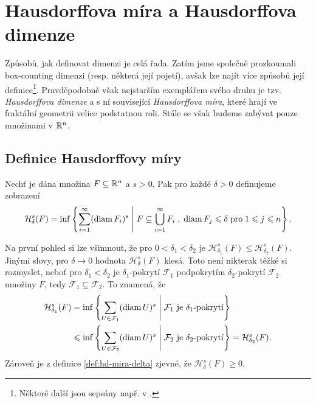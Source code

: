 \section{Hausdorffova míra a Hausdorffova dimenze}\label{sec:hausdorffova-mira-dimenze}

Způsobů, jak definovat dimenzi je celá řada. Zatím jsme společně prozkoumali box-counting dimenzi (resp. některá její pojetí), avšak lze najít více způsobů její definice\footnote{Některé další jsou sepsány např. v \citep[str. 40]{Falconer2014}.}. Pravděpodobně však nejstarším exemplářem svého druhu je tzv. \emph{Hausdorffova dimenze} a s ní související \emph{Hausdorffova míra}, které hrají ve fraktální geometrii velice podstatnou roli. Stále se však budeme zabývat pouze množinami v $\mathbb{R}^n$.

\subsection{Definice Hausdorffovy míry}\label{subsec:hd-mira-definice}

\begin{definition}\label{def:hd-mira-delta}
    Nechť je dána množina $F\subseteq\mathbb{R}^n$ a $s>0$. Pak pro každé $\delta>0$ definujeme zobrazení
    \[\mathcal{H}_\delta^s(F)=\inf\left\{\sum_{i=1}^{\infty}(\operatorname{diam}{F_i})^s\;\middle|\;F\subseteq\bigcup_{i=1}^\infty F_i\;,\;\operatorname{diam}{F_j}\leqslant\delta\;\text{pro}\;1\leqslant j\leqslant n\right\}.\]
\end{definition}
Na první pohled si lze všimnout, že pro $0<\delta_1<\delta_2$ je $\mathcal{H}_{\delta_1}^s(F)\leqslant\mathcal{H}_{\delta_2}^s(F)$. Jinými slovy, pro $\delta\to 0$ hodnota $\mathcal{H}_\delta^s(F)$ klesá. Toto není nikterak těžké si rozmyslet, neboť pro $\delta_1<\delta_2$ je $\delta_1$-pokrytí $\mathcal{F}_1$ podpokrytím $\delta_2$-pokrytí $\mathcal{F}_2$ množiny $F$, tedy $\mathcal{F}_1\subseteq\mathcal{F}_2$. To znamená, že
\begin{align*}
    \mathcal{H}_{\delta_1}^s(F)&=\inf\left\{\sum_{U\in\mathcal{F}_1}(\operatorname{diam}{U})^s\;\middle|\;\text{$\mathcal{F}_1$ je $\delta_1$-pokrytí}\right\}\\
    &\leqslant\inf\left\{\sum_{U\in\mathcal{F}_2}(\operatorname{diam}{U})^s\;\middle|\;\text{$\mathcal{F}_2$ je $\delta_2$-pokrytí}\right\}=\mathcal{H}_{\delta_2}^s(F).
\end{align*}
Zároveň je z definice \ref{def:hd-mira-delta} zjevné, že $\mathcal{H}_\delta^s(F)\geqslant 0$.